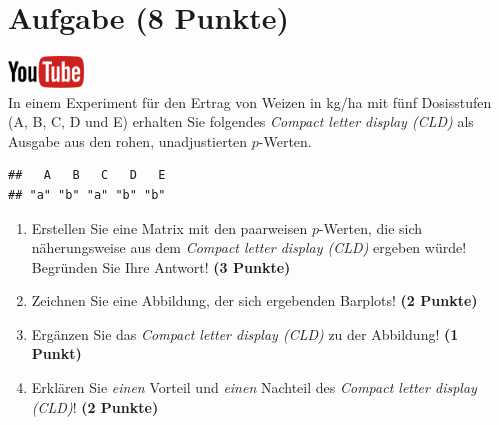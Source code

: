 \documentclass[a4paper, 10pt]{scrartcl}\usepackage[]{graphicx}\usepackage[]{xcolor}
\makeatletter
\newenvironment{kframe}{%
 \def\at@end@of@kframe{}%
 \ifinner\ifhmode%
  \def\at@end@of@kframe{\end{minipage}}%
  \begin{minipage}{\columnwidth}%
 \fi\fi%
 \def\FrameCommand##1{\hskip\@totalleftmargin \hskip-\fboxsep
 \colorbox{shadecolor}{##1}\hskip-\fboxsep
     \hskip-\linewidth \hskip-\@totalleftmargin \hskip\columnwidth}%
 \MakeFramed {\advance\hsize-\width
   \@totalleftmargin\z@ \linewidth\hsize
   \@setminipage}}%
 {\par\unskip\endMakeFramed%
 \at@end@of@kframe}
\newenvironment{knitrout}{}{} %
\makeatother
\begin{document}
 
\clearpage

\section{Aufgabe \hfill (8 Punkte)}


 \hfill\href{https://youtu.be/xq29O8qDrg0}{\includegraphics[width =
   2cm]{img/youtube}}\\[1Ex]


 
 In einem Experiment f{\"u}r den Ertrag von Weizen in kg/ha mit f{\"u}nf
 Dosisstufen (A, B, C, D und E) erhalten Sie folgendes \textit{Compact
   letter display (CLD)} als \Rlogo Ausgabe aus den rohen, unadjustierten
 $p$-Werten.



\begin{knitrout}
\color{fgcolor}\begin{kframe}
\begin{verbatim}
##   A   B   C   D   E 
## "a" "b" "a" "b" "b"
\end{verbatim}
\end{kframe}
\end{knitrout}

\begin{enumerate}
\item Erstellen Sie eine Matrix mit den paarweisen $p$-Werten, die sich
  n{\"a}herungsweise aus dem \textit{Compact letter display (CLD)} ergeben w{\"u}rde! Begr{\"u}nden Sie Ihre Antwort! \textbf{(3 Punkte)}
\item Zeichnen Sie eine Abbildung, der sich ergebenden Barplots! \textbf{(2 Punkte)}
\item Erg{\"a}nzen Sie das \textit{Compact letter display (CLD)} zu der
  Abbildung! \textbf{(1 Punkt)}
\item Erkl{\"a}ren Sie \textit{einen} Vorteil und \textit{einen} Nachteil des \textit{Compact letter display (CLD)}! \textbf{(2 Punkte)}
\end{enumerate}
\end{document}

